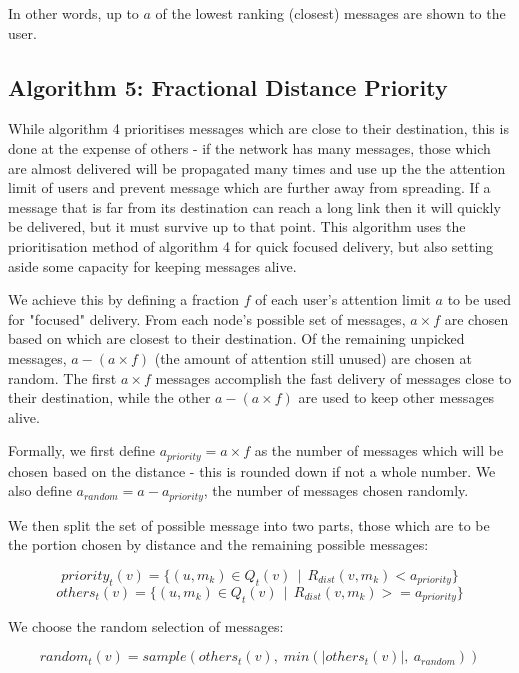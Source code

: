 \documentclass[bsc,frontabs,twoside,singlespacing,parskip,deptreport]{infthesis}     %
\begin{document}
In other words, up to $a$ of the lowest ranking (closest) messages are shown to the user.

\subsection{Algorithm 5: Fractional Distance Priority}
While algorithm 4 prioritises messages which are close to their destination, this is done at the expense of others - if the network has many messages, those which are almost delivered will be propagated many times and use up the the attention limit of users and prevent message which are further away from spreading. If a message that is far from its destination can reach a long link then it will quickly be delivered, but it must survive up to that point. This algorithm uses the prioritisation method of algorithm 4 for quick focused delivery, but also setting aside some capacity for keeping messages alive.

We achieve this by defining a fraction $f$ of each user's attention limit $a$ to be used for "focused" delivery. From each node's possible set of messages, $a \times f$ are chosen based on which are closest to their destination. Of the remaining unpicked messages, $a - (a \times f)$ (the amount of attention still unused) are chosen at random. The first $a \times f$ messages accomplish the fast delivery of messages close to their destination, while the other $a - (a \times f)$ are used to keep other messages alive.

Formally, we first define $a_{priority} = a \times f$ as the number of messages which will be chosen based on the distance - this is rounded down if not a whole number. We also define $a_{random} = a - a_{priority}$, the number of messages chosen randomly.

We then split the set of possible message into two parts, those which are to be the portion chosen by distance and the remaining possible messages:

\begin{equation}
priority_{t}(v) = \{ (u, m_{k}) \in Q_{t}(v) \:\: | \:\: R_{dist}(v, m_{k}) < a_{priority} \}
\end{equation}
\begin{equation}
others_{t}(v) = \{ (u, m_{k}) \in Q_{t}(v) \:\: | \:\: R_{dist}(v, m_{k}) >= a_{priority} \}
\end{equation}

We choose the random selection of messages:

\begin{equation}
random_{t}(v) = sample(others_{t}(v), \; min(|others_{t}(v)|, \: a_{random}))
\end{equation}
\end{document}
